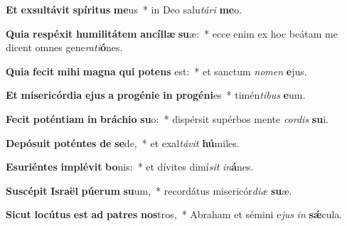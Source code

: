 \item \textbf{Et} \textbf{ex}\textbf{sul}\textbf{tá}\textbf{vit} \textbf{spí}\textbf{ri}\textbf{tus} \textbf{me}us~* in Deo salu\textit{tá}\textit{ri} \textbf{me}o.
\item \textbf{Qui}\textbf{a} \textbf{re}\textbf{spé}\textbf{xit} \textbf{hu}\textbf{mi}\textbf{li}\textbf{tá}\textbf{tem} \textbf{an}\textbf{cíl}\textbf{læ} \textbf{su}æ:~* ecce enim ex hoc beátam me dicent omnes gene\textit{ra}\textit{ti}\textbf{ó}nes.
\item \textbf{Qui}\textbf{a} \textbf{fe}\textbf{cit} \textbf{mi}\textbf{hi} \textbf{ma}\textbf{gna} \textbf{qui} \textbf{pot}\textbf{ens} est:~* et sanctum \textit{no}\textit{men} \textbf{e}jus.
\item \textbf{Et} \textbf{mi}\textbf{se}\textbf{ri}\textbf{cór}\textbf{di}\textbf{a} \textbf{e}\textbf{jus} \textbf{a} \textbf{pro}\textbf{gé}\textbf{ni}\textbf{e} \textbf{in} \textbf{pro}\textbf{gé}\textbf{ni}es~* timén\textit{ti}\textit{bus} \textbf{e}um.
\item \textbf{Fe}\textbf{cit} \textbf{pot}\textbf{én}\textbf{ti}\textbf{am} \textbf{in} \textbf{brá}\textbf{chi}\textbf{o} \textbf{su}o:~* dispérsit supérbos mente \textit{cor}\textit{dis} \textbf{su}i.
\item \textbf{De}\textbf{pó}\textbf{su}\textbf{it} \textbf{pot}\textbf{én}\textbf{tes} \textbf{de} \textbf{se}de,~* et exal\textit{tá}\textit{vit} \textbf{hú}miles.
\item \textbf{E}\textbf{su}\textbf{ri}\textbf{én}\textbf{tes} \textbf{im}\textbf{plé}\textbf{vit} \textbf{bo}nis:~* et dívites dimí\textit{sit} \textit{in}\textbf{á}nes.
\item \textbf{Su}\textbf{scé}\textbf{pit} \textbf{Is}\textbf{ra}\textbf{ël} \textbf{pú}\textbf{e}\textbf{rum} \textbf{su}um,~* recordátus misericór\textit{di}\textit{æ} \textbf{su}æ.
\item \textbf{Sic}\textbf{ut} \textbf{lo}\textbf{cú}\textbf{tus} \textbf{est} \textbf{ad} \textbf{pa}\textbf{tres} \textbf{nos}tros,~* Abraham et sémini e\textit{jus} \textit{in} \textbf{sǽ}cula.
